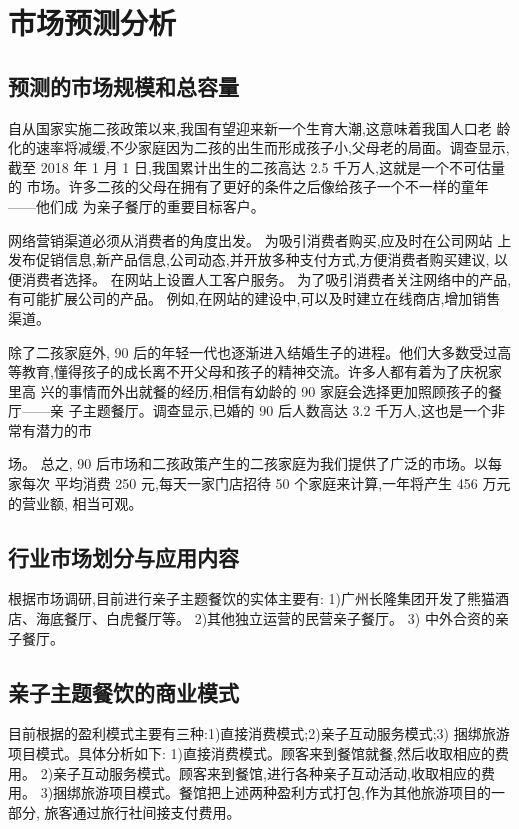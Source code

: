 \section{市场预测分析}

\subsection{预测的市场规模和总容量}
自从国家实施二孩政策以来,我国有望迎来新一个生育大潮,这意味着我国人口老
龄化的速率将减缓,不少家庭因为二孩的出生而形成孩子小,父母老的局面。调查显示,
截至 2018 年 1 月 1 日,我国累计出生的二孩高达 2.5 千万人,这就是一个不可估量的
市场。许多二孩的父母在拥有了更好的条件之后像给孩子一个不一样的童年——他们成
为亲子餐厅的重要目标客户。

网络营销渠道必须从消费者的角度出发。 为吸引消费者购买,应及时在公司网站
上发布促销信息,新产品信息,公司动态,并开放多种支付方式,方便消费者购买建议,
以便消费者选择。 在网站上设置人工客户服务。 为了吸引消费者关注网络中的产品,
有可能扩展公司的产品。 例如,在网站的建设中,可以及时建立在线商店,增加销售
渠道。

除了二孩家庭外, 90 后的年轻一代也逐渐进入结婚生子的进程。他们大多数受过高
等教育,懂得孩子的成长离不开父母和孩子的精神交流。许多人都有着为了庆祝家里高
兴的事情而外出就餐的经历,相信有幼龄的 90 家庭会选择更加照顾孩子的餐厅——亲
子主题餐厅。调查显示,已婚的 90 后人数高达 3.2 千万人,这也是一个非常有潜力的市

场。
总之, 90 后市场和二孩政策产生的二孩家庭为我们提供了广泛的市场。以每家每次
平均消费 250 元,每天一家门店招待 50 个家庭来计算,一年将产生 456 万元的营业额,
相当可观。

\subsection{行业市场划分与应用内容}
根据市场调研,目前进行亲子主题餐饮的实体主要有:
1)广州长隆集团开发了熊猫酒店、海底餐厅、白虎餐厅等。
2)其他独立运营的民营亲子餐厅。
3) 中外合资的亲子餐厅。

\subsection{亲子主题餐饮的商业模式}
目前根据的盈利模式主要有三种:1)直接消费模式;2)亲子互动服务模式;3)
捆绑旅游项目模式。具体分析如下:
1)直接消费模式。顾客来到餐馆就餐,然后收取相应的费用。
2)亲子互动服务模式。顾客来到餐馆,进行各种亲子互动活动,收取相应的费用。
3)捆绑旅游项目模式。餐馆把上述两种盈利方式打包,作为其他旅游项目的一部分,
旅客通过旅行社间接支付费用。
